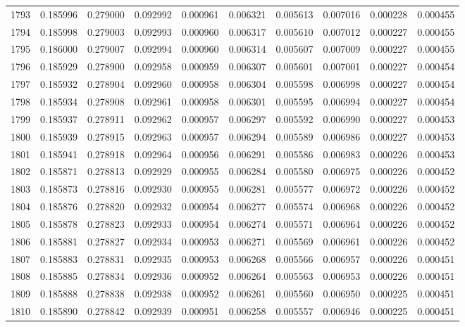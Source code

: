 \begin{tabular}{lrrrrrrrrr}
1793 & 0.185996 & 0.279000 & 0.092992 & 0.000961 & 0.006321 & 0.005613 & 0.007016 & 0.000228 & 0.000455 \\
1794 & 0.185998 & 0.279003 & 0.092993 & 0.000960 & 0.006317 & 0.005610 & 0.007012 & 0.000227 & 0.000455 \\
1795 & 0.186000 & 0.279007 & 0.092994 & 0.000960 & 0.006314 & 0.005607 & 0.007009 & 0.000227 & 0.000455 \\
1796 & 0.185929 & 0.278900 & 0.092958 & 0.000959 & 0.006307 & 0.005601 & 0.007001 & 0.000227 & 0.000454 \\
1797 & 0.185932 & 0.278904 & 0.092960 & 0.000958 & 0.006304 & 0.005598 & 0.006998 & 0.000227 & 0.000454 \\
1798 & 0.185934 & 0.278908 & 0.092961 & 0.000958 & 0.006301 & 0.005595 & 0.006994 & 0.000227 & 0.000454 \\
1799 & 0.185937 & 0.278911 & 0.092962 & 0.000957 & 0.006297 & 0.005592 & 0.006990 & 0.000227 & 0.000453 \\
1800 & 0.185939 & 0.278915 & 0.092963 & 0.000957 & 0.006294 & 0.005589 & 0.006986 & 0.000227 & 0.000453 \\
1801 & 0.185941 & 0.278918 & 0.092964 & 0.000956 & 0.006291 & 0.005586 & 0.006983 & 0.000226 & 0.000453 \\
1802 & 0.185871 & 0.278813 & 0.092929 & 0.000955 & 0.006284 & 0.005580 & 0.006975 & 0.000226 & 0.000452 \\
1803 & 0.185873 & 0.278816 & 0.092930 & 0.000955 & 0.006281 & 0.005577 & 0.006972 & 0.000226 & 0.000452 \\
1804 & 0.185876 & 0.278820 & 0.092932 & 0.000954 & 0.006277 & 0.005574 & 0.006968 & 0.000226 & 0.000452 \\
1805 & 0.185878 & 0.278823 & 0.092933 & 0.000954 & 0.006274 & 0.005571 & 0.006964 & 0.000226 & 0.000452 \\
1806 & 0.185881 & 0.278827 & 0.092934 & 0.000953 & 0.006271 & 0.005569 & 0.006961 & 0.000226 & 0.000452 \\
1807 & 0.185883 & 0.278831 & 0.092935 & 0.000953 & 0.006268 & 0.005566 & 0.006957 & 0.000226 & 0.000451 \\
1808 & 0.185885 & 0.278834 & 0.092936 & 0.000952 & 0.006264 & 0.005563 & 0.006953 & 0.000226 & 0.000451 \\
1809 & 0.185888 & 0.278838 & 0.092938 & 0.000952 & 0.006261 & 0.005560 & 0.006950 & 0.000225 & 0.000451 \\
1810 & 0.185890 & 0.278842 & 0.092939 & 0.000951 & 0.006258 & 0.005557 & 0.006946 & 0.000225 & 0.000451 \\

\end{tabular}

